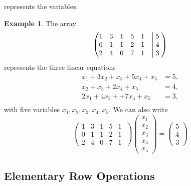 \documentclass[a4paper]{article}
\theoremstyle{definition}
\newtheorem*{eg}{Example}
\begin{document}
represents the variables.
\begin{eg}
     The array
     \begin{equation*}
          \begin{pmatrix}
               1 & 3 & 1 & 5 & 1 &\bigm|  5\; \\
               0 & 1 & 1 & 2 & 1 &\bigm|  4\; \\ 
               2 & 4 & 0 & 7 & 1 &\bigm|  3\;
           \end{pmatrix}
     \end{equation*}
     represents the three linear equations
     \begin{align*}
          x_1+3x_2+x_3+5x_4+x_5 &= 5, \\
               x_2+x_3+2x_4+x_5 &= 4, \\
          2x_1+4x_2+  +7x_4+x_5 &= 3, \\
     \end{align*}
     with five variables $x_1,x_2,x_3,x_4,x_5$. We can also write
     \begin{equation*}
          \begin{pmatrix}
               1 & 3 & 1 & 5 & 1  \; \\
               0 & 1 & 1 & 2 & 1  \; \\ 
               2 & 4 & 0 & 7 & 1  \;
           \end{pmatrix}
           \begin{pmatrix}
               x_{1} \\
               x_{2} \\
               x_{3} \\ 
               x_{4} \\ 
               x_{5}
           \end{pmatrix} =
           \begin{pmatrix}
               5 \\
               4 \\
               3
           \end{pmatrix}
     \end{equation*}
\end{eg}


\subsection{Elementary Row Operations}
\end{document}
